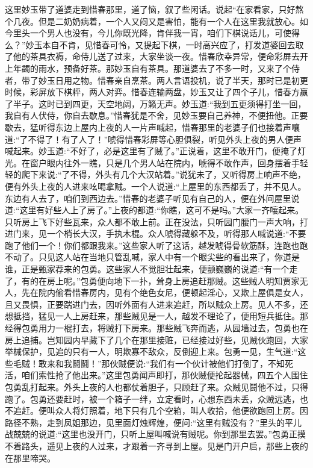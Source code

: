 \begin{parag}
    这里妙玉带了道婆走到惜春那里，道了恼，叙了些闲话。说起“在家看家，只好熬个几夜。但是二奶奶病着，一个人又闷又是害怕，能有一个人在这里我就放心。如今里头一个男人也没有，今儿你既光降，肯伴我一宵，咱们下棋说话儿，可使得么？”妙玉本自不肯，见惜春可怜，又提起下棋，一时高兴应了，打发道婆回去取了他的茶具衣褥，命侍儿送了过来，大家坐谈一夜。惜春欣幸异常，便命彩屏去开上年蠲的雨水，预备好茶。那妙玉自有茶具。那道婆去了不多一时，又来了个侍者，带了妙玉日用之物。惜春亲自烹茶。两人言语投机，说了半天，那时已是初更时候，彩屏放下棋枰，两人对弈。惜春连输两盘，妙玉又让了四个子儿，惜春方赢了半子。这时已到四更，天空地阔，万籁无声。妙玉道:“我到五更须得打坐一回，我自有人伏侍，你自去歇息。”惜春犹是不舍，见妙玉要自己养神，不便扭他。正要歇去，猛听得东边上屋内上夜的人一片声喊起，惜春那里的老婆子们也接着声嚷道:“了不得了！有了人了！”唬得惜春彩屏等心胆俱裂，听见外头上夜的男人便声喊起来。妙玉道:“不好了，必是这里有了贼了。”正说着，这里不敢开门，便掩了灯光。在窗户眼内往外一瞧，只是几个男人站在院内，唬得不敢作声，回身摆着手轻轻的爬下来说:“了不得，外头有几个大汉站着。”说犹未了，又听得房上响声不绝，便有外头上夜的人进来吆喝拿贼。一个人说道:“上屋里的东西都丢了，并不见人。东边有人去了，咱们到西边去。”惜春的老婆子听见有自己的人，便在外间屋里说道:“这里有好些人上了房了。”上夜的都道:“你瞧，这可不是吗。”大家一齐嚷起来。只听房上飞下好些瓦来，众人都不敢上前。正在没法，只听园门腰门一声大响，打进门来，见一个梢长大汉，手执木棍。众人唬得藏躲不及，听得那人喊说道:“不要跑了他们一个！你们都跟我来。”这些家人听了这话，越发唬得骨软筋酥，连跑也跑不动了。只见这人站在当地只管乱喊，家人中有一个眼尖些的看出来了，你道是谁，正是甄家荐来的包勇。这些家人不觉胆壮起来，便颤巍巍的说道:“有一个走了，有的在房上呢。”包勇便向地下一扑，耸身上房追赶那贼。这些贼人明知贾家无人，先在院内偷看惜春房内，见有个绝色女尼，便顿起淫心，又欺上屋俱是女人，且又畏惧，正要踹进门去，因听外面有人进来追赶，所以贼众上房。见人不多，还想抵挡，猛见一人上房赶来，那些贼见是一人，越发不理论了，便用短兵抵住。那经得包勇用力一棍打去，将贼打下房来。那些贼飞奔而逃，从园墙过去，包勇也在房上追捕。岂知园内早藏下了几个在那里接赃，已经接过好些，见贼伙跑回，大家举械保护，见追的只有一人，明欺寡不敌众，反倒迎上来。包勇一见，生气道:“这些毛贼！敢来和我鬪鬪！”那伙贼便说:“我们有一个伙计被他们打倒了，不知死活，咱们索性抢了他出来。”这里包勇闻声即打，那伙贼便抡起器械，四五个人围住包勇乱打起来。外头上夜的人也都仗着胆子，只顾赶了来。众贼见鬪他不过，只得跑了。包勇还要赶时，被一个箱子一绊，立定看时，心想东西未丢，众贼远逃，也不追赶。便叫众人将灯照着，地下只有几个空箱，叫人收拾，他便欲跑回上房。因路径不熟，走到凤姐那边，见里面灯烛辉煌，便问:“这里有贼没有？”里头的平儿战兢兢的说道:“这里也没开门，只听上屋叫喊说有贼呢。你到那里去罢。”包勇正摸不着路头，遥见上夜的人过来，才跟着一齐寻到上屋。见是门开户启，那些上夜的在那里啼哭。
\end{parag}


